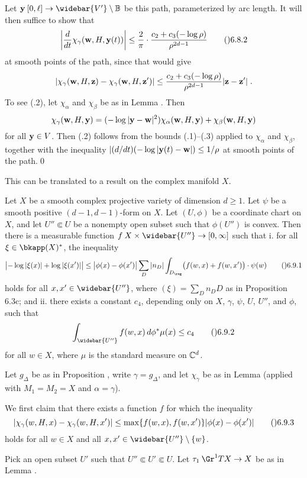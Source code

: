 Let $\bold y\:[0,\ell]\to\widebar{V'}\setminus\Bbb B$ be this path, parameterized by arc length.  It will then suffice to show that
$$\left|\frac d{dt}\chi_\gamma(\bold w,H,\bold y(t))\right|
  \le \frac2\pi\cdot\frac{c_2+c_3(-\log\rho)}{\rho^{2d-1}}\tag\06.8.2$$
at smooth points of the path, since that would give
$$|\chi_\gamma(\bold w,H,\bold z) - \chi_\gamma(\bold w,H,\bold z')|
  \le \frac{c_2+c_3(-\log\rho)}{\rho^{2d-1}} |\bold z-\bold z'|\;.$$
To see (.2), let $\chi_\alpha$ and $\chi_\beta$ be as in Lemma .
Then
$$\chi_\gamma(\bold w,H,\bold y)
  = (-\log|\bold y-\bold w|^2)\chi_\alpha(\bold w,H,\bold y)
    + \chi_\beta(\bold w,H,\bold y)$$
for all $\bold y\in V$.  Then (.2) follows from the bounds
(.1)--(.3) applied to $\chi_\alpha$ and $\chi_\beta$,
together with the inequality $|(d/dt)(-\log|\bold y(t)-\bold w|)\le 1/\rho$
at smooth points of the path.\qed
\enddemo

This can be translated to a result on the complex manifold $X$.

  Let $X$ be a smooth complex projective variety
of dimension $d\ge1$.
Let $\psi$ be a smooth positive $(d-1,d-1)$\snug-form on $X$.
Let $(U,\phi)$ be a coordinate chart on $X$, and let $U''\Subset U$
be a nonempty open subset such that $\phi(U'')$ is convex.  Then there is
a measurable function $f\:X\times\widebar{U''}\to[0,\infty]$ such that
\roster
\myitem i.  for all $\xi\in\bkapp(X)^{*}$, the inequality
$$\bigl|-\log|\xi(x)|+\log|\xi(x')|\bigr|
  \le \bigl|\phi(x)-\phi(x')\bigr| \sum_D
    |n_D|\int_{D_\reg} \bigl(f(w,x)+f(w,x')\bigr)\cdot\psi(w)\tag\06.9.1$$
holds for all $x,x'\in\widebar{U''}$, where $(\xi)=\sum_D n_D D$ as in
Proposition \06.3c; and
\myitem ii.  there exists a constant $c_4$, depending only on $X$, $\gamma$,
$\psi$, $U$, $U''$, and $\phi$, such that
$$\int_{\widebar{U''}} f(w,x)\, d\phi^{*}\mu(x) \le c_4\tag\06.9.2$$
for all $w\in X$, where $\mu$ is the standard measure on $\Bbb C^d$.
\endroster
\endit

Let $g_\Delta$ be as in Proposition , write $\gamma=g_\Delta$,
and let $\chi_\gamma$ be as in Lemma  (applied with $M_1=M_2=X$
and $\alpha=\gamma$).

We first claim that there exists a function $f$ for which the inequality
$$|\chi_\gamma(w,H,x)-\chi_\gamma(w,H,x')|
  \le \max\{f(w,x),f(w,x')\}|\phi(x)-\phi(x')|\tag\06.9.3$$
holds for all $w\in X$ and all $x,x'\in\widebar{U''}\setminus\{w\}$.

Pick an open subset $U'$ such that $U''\Subset U'\Subset U$.
Let $\tau_1\:\Gr^1 TX\to X$ be as in Lemma .

